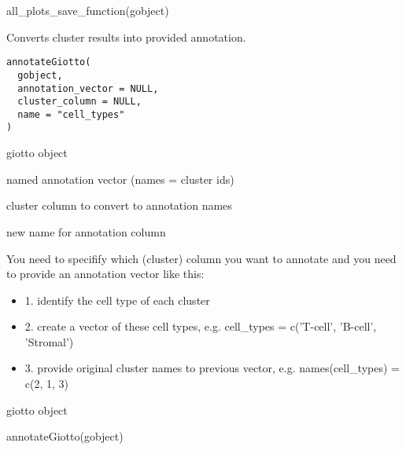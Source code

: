 \documentclass[a4paper]{book}
\begin{document}
%
\begin{Examples}
\begin{ExampleCode}
    all_plots_save_function(gobject)
\end{ExampleCode}
\end{Examples}
%
\begin{Description}\relax
Converts cluster results into provided annotation.
\end{Description}
%
\begin{Usage}
\begin{verbatim}
annotateGiotto(
  gobject,
  annotation_vector = NULL,
  cluster_column = NULL,
  name = "cell_types"
)
\end{verbatim}
\end{Usage}
%
\begin{Arguments}
\begin{ldescription}
\item[\code{gobject}] giotto object

\item[\code{annotation\_vector}] named annotation vector (names = cluster ids)

\item[\code{cluster\_column}] cluster column to convert to annotation names

\item[\code{name}] new name for annotation column
\end{ldescription}
\end{Arguments}
%
\begin{Details}\relax
You need to specifify which (cluster) column you want to annotate
and you need to provide an annotation vector like this:
\begin{itemize}

\item{} 1. identify the cell type of each cluster
\item{} 2. create a vector of these cell types, e.g. cell\_types =  c('T-cell', 'B-cell', 'Stromal')
\item{} 3. provide original cluster names to previous vector, e.g. names(cell\_types) = c(2, 1, 3)

\end{itemize}

\end{Details}
%
\begin{Value}
giotto object
\end{Value}
%
\begin{Examples}
\begin{ExampleCode}
    annotateGiotto(gobject)
\end{ExampleCode}
\end{Examples}
\end{document}
